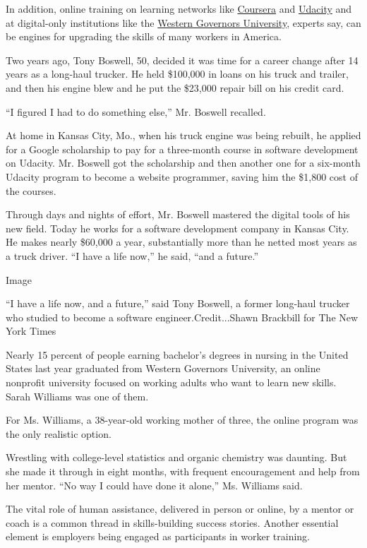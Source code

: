 In addition, online training on learning networks like
\href{https://www.coursera.org/}{Coursera} and
\href{https://www.udacity.com/}{Udacity} and at digital-only
institutions like the \href{https://www.wgu.edu/}{Western Governors
University}, experts say, can be engines for upgrading the skills of
many workers in America.

Two years ago, Tony Boswell, 50, decided it was time for a career change
after 14 years as a long-haul trucker. He held \$100,000 in loans on his
truck and trailer, and then his engine blew and he put the \$23,000
repair bill on his credit card.

``I figured I had to do something else,'' Mr. Boswell recalled.

At home in Kansas City, Mo., when his truck engine was being rebuilt, he
applied for a Google scholarship to pay for a three-month course in
software development on Udacity. Mr. Boswell got the scholarship and
then another one for a six-month Udacity program to become a website
programmer, saving him the \$1,800 cost of the courses.

Through days and nights of effort, Mr. Boswell mastered the digital
tools of his new field. Today he works for a software development
company in Kansas City. He makes nearly \$60,000 a year, substantially
more than he netted most years as a truck driver. ``I have a life now,''
he said, ``and a future.''

Image

``I have a life now, and a future,'' said Tony Boswell, a former
long-haul trucker who studied to become a software
engineer.Credit...Shawn Brackbill for The New York Times

Nearly 15 percent of people earning bachelor's degrees in nursing in the
United States last year graduated from Western Governors University, an
online nonprofit university focused on working adults who want to learn
new skills. Sarah Williams was one of them.

For Ms. Williams, a 38-year-old working mother of three, the online
program was the only realistic option.

Wrestling with college-level statistics and organic chemistry was
daunting. But she made it through in eight months, with frequent
encouragement and help from her mentor. ``No way I could have done it
alone,'' Ms. Williams said.

The vital role of human assistance, delivered in person or online, by a
mentor or coach is a common thread in skills-building success stories.
Another essential element is employers being engaged as participants in
worker training.

